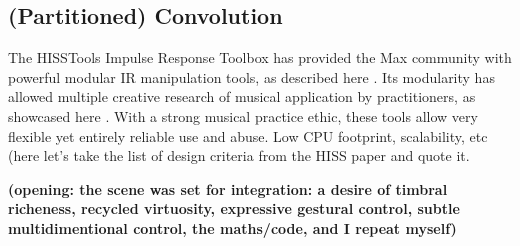\subsection{(Partitioned) Convolution}

The HISSTools Impulse Response Toolbox has provided the Max community with powerful modular IR manipulation tools, as described here \cite{HarkerTremblay-icmc2012-hisstools}. Its modularity has allowed multiple creative research of musical application by practitioners, as showcased here \cite{HarkerTremblay-forum2013-rethinking-the-box}. With a strong musical practice ethic, these tools allow very flexible yet entirely reliable use and abuse. Low CPU footprint, scalability, etc (here let's take the list of design criteria from the HISS paper and quote it.

\textbf{(opening: the scene was set for integration: a desire of timbral richeness, recycled virtuosity, expressive gestural control, subtle multidimentional control, the maths/code, and I repeat myself)}
